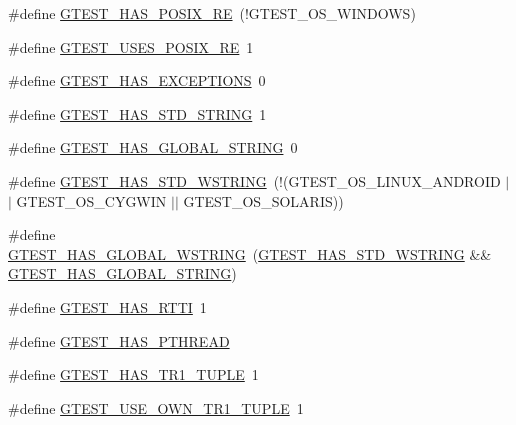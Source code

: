 \begin{DoxyCompactItemize}
\#define \mbox{\hyperlink{gtest-port_8h_af5c4295ea1d76f07f65934f659792431}{G\+T\+E\+S\+T\+\_\+\+H\+A\+S\+\_\+\+P\+O\+S\+I\+X\+\_\+\+RE}}~(!G\+T\+E\+S\+T\+\_\+\+O\+S\+\_\+\+W\+I\+N\+D\+O\+WS)
\item 
\#define \mbox{\hyperlink{gtest-port_8h_acecef794eeb09598cd47da764271cb18}{G\+T\+E\+S\+T\+\_\+\+U\+S\+E\+S\+\_\+\+P\+O\+S\+I\+X\+\_\+\+RE}}~1
\item 
\#define \mbox{\hyperlink{gtest-port_8h_aedcf220690e6589d0fc2bd3db768ea66}{G\+T\+E\+S\+T\+\_\+\+H\+A\+S\+\_\+\+E\+X\+C\+E\+P\+T\+I\+O\+NS}}~0
\item 
\#define \mbox{\hyperlink{gtest-port_8h_adba1121430c11cee8ba0c74e8cf6aa40}{G\+T\+E\+S\+T\+\_\+\+H\+A\+S\+\_\+\+S\+T\+D\+\_\+\+S\+T\+R\+I\+NG}}~1
\item 
\#define \mbox{\hyperlink{gtest-port_8h_a6ab57c4a17233dd4ed30c2926bb99cc5}{G\+T\+E\+S\+T\+\_\+\+H\+A\+S\+\_\+\+G\+L\+O\+B\+A\+L\+\_\+\+S\+T\+R\+I\+NG}}~0
\item 
\#define \mbox{\hyperlink{gtest-port_8h_a6e087748d8bbd2ca57c487b6ad268670}{G\+T\+E\+S\+T\+\_\+\+H\+A\+S\+\_\+\+S\+T\+D\+\_\+\+W\+S\+T\+R\+I\+NG}}~(!(G\+T\+E\+S\+T\+\_\+\+O\+S\+\_\+\+L\+I\+N\+U\+X\+\_\+\+A\+N\+D\+R\+O\+ID $\vert$$\vert$ G\+T\+E\+S\+T\+\_\+\+O\+S\+\_\+\+C\+Y\+G\+W\+IN $\vert$$\vert$ G\+T\+E\+S\+T\+\_\+\+O\+S\+\_\+\+S\+O\+L\+A\+R\+IS))
\item 
\#define \mbox{\hyperlink{gtest-port_8h_afca9ecaf5846561187a15b75013aa85b}{G\+T\+E\+S\+T\+\_\+\+H\+A\+S\+\_\+\+G\+L\+O\+B\+A\+L\+\_\+\+W\+S\+T\+R\+I\+NG}}~(\mbox{\hyperlink{gtest-port_8h_a6e087748d8bbd2ca57c487b6ad268670}{G\+T\+E\+S\+T\+\_\+\+H\+A\+S\+\_\+\+S\+T\+D\+\_\+\+W\+S\+T\+R\+I\+NG}} \&\& \mbox{\hyperlink{gtest-port_8h_a6ab57c4a17233dd4ed30c2926bb99cc5}{G\+T\+E\+S\+T\+\_\+\+H\+A\+S\+\_\+\+G\+L\+O\+B\+A\+L\+\_\+\+S\+T\+R\+I\+NG}})
\item 
\#define \mbox{\hyperlink{gtest-port_8h_a9ba781217167f905bff2f1c410a97930}{G\+T\+E\+S\+T\+\_\+\+H\+A\+S\+\_\+\+R\+T\+TI}}~1
\item 
\#define \mbox{\hyperlink{gtest-port_8h_a3341397e1952de0b9cd88762d4d3ae4b}{G\+T\+E\+S\+T\+\_\+\+H\+A\+S\+\_\+\+P\+T\+H\+R\+E\+AD}}
\item 
\#define \mbox{\hyperlink{gtest-port_8h_a6de49dd4cbae1db15dc6edca3b179d1b}{G\+T\+E\+S\+T\+\_\+\+H\+A\+S\+\_\+\+T\+R1\+\_\+\+T\+U\+P\+LE}}~1
\item 
\#define \mbox{\hyperlink{gtest-port_8h_afa144e5f5d039db0df873e7ad48c1fda}{G\+T\+E\+S\+T\+\_\+\+U\+S\+E\+\_\+\+O\+W\+N\+\_\+\+T\+R1\+\_\+\+T\+U\+P\+LE}}~1
\item 

\end{DoxyCompactItemize}
